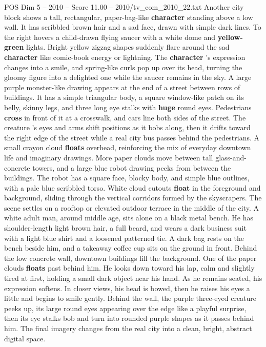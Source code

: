 \begin{textsample}{POS Dim 5 – 2010 – Score 11.00 – 2010/tv\_com\_2010\_22.txt}
Another city block shows a tall, rectangular, paper-bag-like \textbf{character} standing above a low wall.
It has scribbled brown hair and a sad face, drawn with simple dark lines.
To the right hovers a child-drawn flying saucer with a white dome and \textbf{yellow-green} lights.
Bright yellow zigzag shapes suddenly flare around the sad \textbf{character} like comic-book energy or lightning.
The \textbf{character} ’s expression changes into a smile, and spring-like curls pop up over its head, turning the gloomy figure into a delighted one while the saucer remains in the sky.
A large purple monster-like drawing appears at the end of a street between rows of buildings.
It has a simple triangular body, a square window-like patch on its belly, skinny legs, and three long eye stalks with \textbf{huge} round eyes.
Pedestrians \textbf{cross} in front of it at a crosswalk, and cars line both sides of the street.
The creature ’s eyes and arms shift positions as it bobs along, then it drifts toward the right edge of the street while a real city bus passes behind the pedestrians.
A small crayon cloud \textbf{floats} overhead, reinforcing the mix of everyday downtown life and imaginary drawings.
More paper clouds move between tall glass-and-concrete towers, and a large blue robot drawing peeks from between the buildings.
The robot has a square face, blocky body, and simple blue outlines, with a pale blue scribbled torso.
White cloud cutouts \textbf{float} in the foreground and background, sliding through the vertical corridors formed by the skyscrapers.
The scene settles on a rooftop or elevated outdoor terrace in the middle of the city.
A white adult man, around middle age, sits alone on a black metal bench.
He has shoulder-length light brown hair, a full beard, and wears a dark business suit with a light blue shirt and a loosened patterned tie.
A dark bag rests on the bench beside him, and a takeaway coffee cup sits on the ground in front.
Behind the low concrete wall, downtown buildings fill the background.
One of the paper clouds \textbf{floats} past behind him.
He looks down toward his lap, calm and slightly tired at first, holding a small dark object near his hand.
As he remains seated, his expression softens.
In closer views, his head is bowed, then he raises his eyes a little and begins to smile gently.
Behind the wall, the purple three-eyed creature peeks up, its large round eyes appearing over the edge like a playful surprise, then its eye stalks bob and turn into rounded purple shapes as it passes behind him.
The final imagery changes from the real city into a clean, bright, abstract digital space.

\end{textsample}
